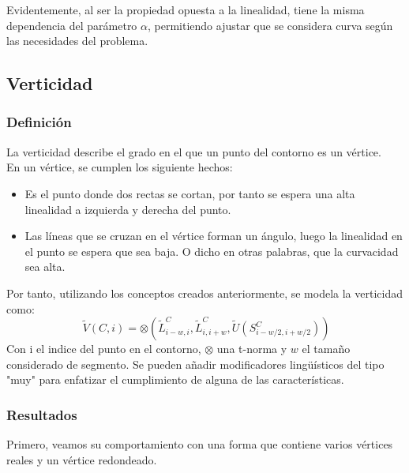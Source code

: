 Evidentemente, al ser la propiedad opuesta a la linealidad, tiene la misma dependencia del parámetro $\alpha$, permitiendo ajustar que se considera curva según las necesidades del problema.\\

\subsection{Verticidad}

\subsubsection{Definición}
La verticidad describe el grado en el que un punto del contorno es un vértice.\\

En un vértice, se cumplen los siguiente hechos:
\begin{itemize}
\item Es el punto donde dos rectas se cortan, por tanto se espera una alta linealidad a izquierda y derecha del punto.
\item Las líneas que se cruzan en el vértice forman un ángulo, luego la linealidad en el punto se espera que sea baja. O dicho en otras palabras, que la curvacidad sea alta.
\end{itemize}

Por tanto, utilizando los conceptos creados anteriormente, se modela la verticidad como:\\

\[
\ \tilde{V}(C,i) = \otimes \left(\tilde{L}^C_{i-w,i}, \tilde{L}^C_{i,i+w},  \tilde{U}(S^C_{i-w/2,i+w/2})   \right)
\]
Con i el indice del punto en el contorno, $ \otimes $ una t-norma y $w$ el tamaño considerado de segmento. Se pueden añadir modificadores lingüísticos del tipo "muy" para enfatizar el cumplimiento de alguna de las características.

\subsubsection{Resultados}

Primero, veamos su comportamiento con una forma que contiene varios vértices reales y un vértice redondeado.\\

